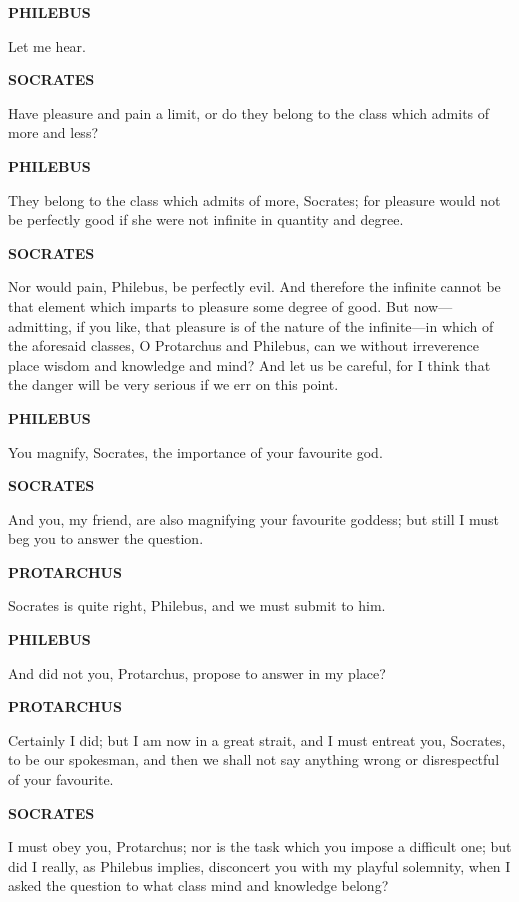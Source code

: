 \documentclass[11pt,letter]{article}
\begin{document}
\par \textbf{PHILEBUS}
\par   Let me hear.

\par \textbf{SOCRATES}
\par   Have pleasure and pain a limit, or do they belong to the class which admits of more and less?

\par \textbf{PHILEBUS}
\par   They belong to the class which admits of more, Socrates; for pleasure would not be perfectly good if she were not infinite in quantity and degree.

\par \textbf{SOCRATES}
\par   Nor would pain, Philebus, be perfectly evil. And therefore the infinite cannot be that element which imparts to pleasure some degree of good. But now—admitting, if you like, that pleasure is of the nature of the infinite—in which of the aforesaid classes, O Protarchus and Philebus, can we without irreverence place wisdom and knowledge and mind? And let us be careful, for I think that the danger will be very serious if we err on this point.

\par \textbf{PHILEBUS}
\par   You magnify, Socrates, the importance of your favourite god.

\par \textbf{SOCRATES}
\par   And you, my friend, are also magnifying your favourite goddess; but still I must beg you to answer the question.

\par \textbf{PROTARCHUS}
\par   Socrates is quite right, Philebus, and we must submit to him.

\par \textbf{PHILEBUS}
\par   And did not you, Protarchus, propose to answer in my place?

\par \textbf{PROTARCHUS}
\par   Certainly I did; but I am now in a great strait, and I must entreat you, Socrates, to be our spokesman, and then we shall not say anything wrong or disrespectful of your favourite.

\par \textbf{SOCRATES}
\par   I must obey you, Protarchus; nor is the task which you impose a difficult one; but did I really, as Philebus implies, disconcert you with my playful solemnity, when I asked the question to what class mind and knowledge belong?
\end{document}
